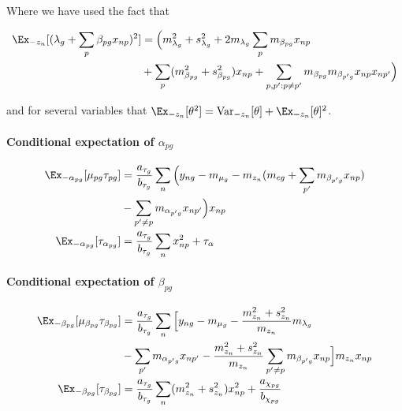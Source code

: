 Where we have used the fact that

\begin{equation}
  \begin{aligned}
\Ex_{-z_n}[(\lambda_g + \sum_p \beta_{pg} x_{np})^2] & =  \Big(m_{\lambda_g}^2 + s_{\lambda_g}^2 + 2m_{\lambda_g} \sum_p m_{\beta_{pg}} x_{np} \\
& +
 \sum_p (m_{\beta_{pg}}^2 + s_{\beta_{pg}}^2) x_{np} +
 \sum_{p,p': p \neq p'} m_{\beta_{pg}} m_{\beta_{p'g}} x_{np}x_{np'}
\Big)
\end{aligned}
\end{equation}

and for several variables that $\Ex_{-z_n}[\theta^2] = \text{Var}_{-z_n}[\theta] + \Ex_{-z_n}[\theta]^2$.

\paragraph{Conditional expectation of $\alpha_{pg}$}

\begin{equation}
\begin{aligned}
\Ex_{-\alpha_{pg}}[\mu_{pg} \tau_{pg}] & =
\frac{a_{\tau_g}}{b_{\tau_g}} \sum_n \Big (
y_{ng} - m_{\mu_g} - m_{z_n}( m_{cg} + \sum_{p'} m_{\beta_{p'g}} x_{np} ) \\
& - \sum_{p' \neq p} m_{\alpha_{p'g}} x_{np'}
\Big) x_{np} \\
\Ex_{-\alpha_{pg}}[\tau_{\alpha_{pg}}] & =
\frac{a_{\tau_g}}{b_{\tau_g}} \sum_n x_{np}^2 + \tau_\alpha
\end{aligned}
\end{equation}

\paragraph{Conditional expectation of $\beta_{pg}$}

\begin{equation}
\begin{aligned}
\Ex_{-\beta_{pg}}[\mu_{\beta_{pg}} \tau_{\beta_{pg}}] & =
\frac{a_{\tau_g}}{b_{\tau_g}} \sum_n \Big[
y_{ng} - m_{\mu_g} - \frac{m_{z_n}^2 + s_{z_n}^2}{m_{z_n}} m_{\lambda_g} \\
& - \sum_{p'} m_{\alpha_{p'g}} x_{np'}
- \frac{m_{z_n}^2 + s_{z_n}^2}{m_{z_n}} \sum_{p' \neq p} m_{\beta_{p'g}} x_{np}
\Big] m_{z_n} x_{np} \\
\Ex_{-\beta_{pg}} [ \tau_{\beta_{pg}} ] & =
\frac{a_{\tau_g}}{b_{\tau_g}} \sum_n (m_{z_n}^2 + s_{z_n}^2) x_{np}^2 +
\frac{a_{\chi_{pg}}}{b_{\chi_{pg}}}
\end{aligned}
\end{equation}

